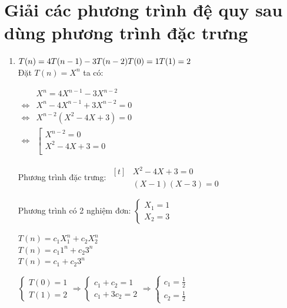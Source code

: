 \documentclass[12pt, letterpaper]{article}
\begin{document}
\section{Giải các phương trình đệ quy sau dùng phương trình đặc trưng}
\begin{enumerate}
	\item $ T(n) = 4T(n - 1) - 3T(n-2) \\
		      T(0) = 1 \\
		      T(1) = 2 $ \\
	      Đặt $ T(n) = X^n $ ta có:

	      $ \begin{aligned}
			                      & X^n = 4X^{n - 1} - 3X^{n - 2}     \\
			      \Leftrightarrow & X^n - 4X^{n - 1} + 3X^{n - 2} = 0 \\
			      \Leftrightarrow & X^{n - 2}(X^2 - 4X + 3) = 0       \\
			      \Leftrightarrow & \left[
			      \begin{array}{ll}
				      X^{n - 2} = 0    \\
				      X^2 - 4X + 3 = 0 \\
			      \end{array}
			      \right .
		      \end{aligned} $

	      Phương trình đặc trưng: $ \begin{aligned}[t]
			       & X^2 - 4X + 3 = 0   \\
			       & (X - 1)(X - 3) = 0
		      \end{aligned} $

	      Phương trình có 2 nghiệm đơn: $ \begin{cases}
			      X_1 = 1 \\
			      X_2 = 3
		      \end{cases} $

	      $ T(n) = c_1X_1^n + c_2X_2^n $ \\
	      $ T(n) = c_1 1^n + c_2 3^n $ \\
	      $ T(n) = c_1 + c_2 3^n $

	      $ \begin{cases}
			      T(0) = 1 \\
			      T(1) = 2
		      \end{cases}
		      \Rightarrow{}
		      \begin{cases}
			      c_1 + c_2 = 1 \\
			      c_1 + 3c_2 = 2
		      \end{cases}
		      \Rightarrow{}
		      \begin{cases}
			      c_1 = \frac{1}{2} \\
			      c_2 = \frac{1}{2}
		      \end{cases} $


\end{enumerate}
\end{document}

